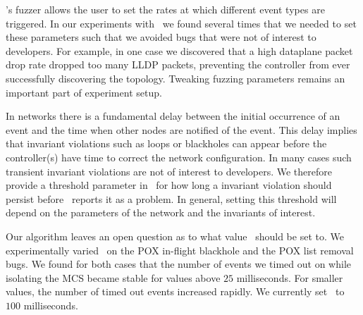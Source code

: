  \projectname's fuzzer allows the
user to set the rates at which different event types are triggered. In our experiments with
\projectname~we found several times that we needed to set these parameters
such that we avoided bugs that were not of interest to developers.
For example, in one case we discovered that a high dataplane
packet drop rate dropped too many LLDP packets, preventing the controller from ever successfully discovering the topology.
Tweaking fuzzing parameters remains an important
part of experiment setup.

 In
networks there is a fundamental delay between the initial occurrence of an
event and the time when other nodes are notified of the event. This delay implies
that invariant violations such as loops or blackholes can appear
before the controller(s) have time to correct the network configuration. In
many cases such transient invariant violations are not of interest to
developers. We therefore provide a threshold parameter in \projectname~for
how long a invariant violation should persist before
\projectname~reports it as a problem. In general, setting this
threshold will depend on the parameters of the network and the invariants of
interest.

 Our algorithm leaves an open question as to what value
\textepsilon~should be set to. We experimentally varied \textepsilon~on the
POX in-flight blackhole and the POX list removal bugs.
We found for both cases that the number of events we timed out on while isolating the MCS became stable for values above $25$ milliseconds.
For smaller values, the number of timed out events increased rapidly. We
currently set \textepsilon~to $100$ milliseconds.


